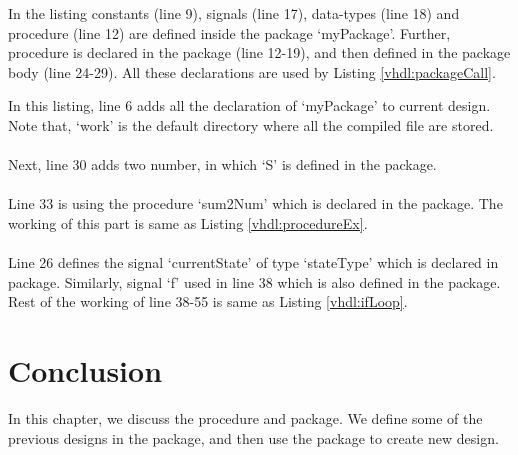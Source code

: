 \begin{explanation}
	In the listing constants (line 9), signals (line 17), data-types (line 18) and procedure (line 12) are defined inside the package `myPackage'. Further, procedure is declared in the package (line 12-19), and then defined in the package body (line 24-29). All these declarations are used by Listing \ref{vhdl:packageCall}. 
\end{explanation}



\begin{explanation}
	In this listing, line 6 adds all the declaration of `myPackage' to current design. Note that, `work' is the default directory where all the compiled file are stored. 
	\\ \\
	Next, line 30 adds two number, in which `S' is defined in the package. 
	\\ \\
	Line 33 is using the procedure `sum2Num' which is declared in the package. The working of this part is same as Listing \ref{vhdl:procedureEx}. 
	\\ \\
	Line 26 defines the signal `currentState' of type `stateType' which is declared in package. Similarly, signal `f' used in line 38 which is also defined in the package. Rest of the working of line 38-55 is same as Listing \ref{vhdl:ifLoop}.
\end{explanation}



\section{Conclusion}
In this chapter, we discuss the procedure and package. We define some of the previous designs in the package, and then use the package to create new design. 